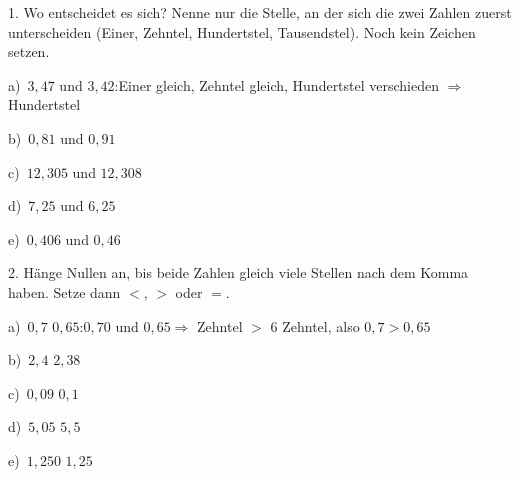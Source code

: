 \documentclass[11pt]{article}
\newcommand{\kennung}{FUR}
\newcommand{\grau}[1]{{\color{mbgrau}#1}}
\begin{document}
\pfheftstil
\fancyfoot[C]{\parbox[t]{\textwidth}{\mbfhbox\par\vspace{1.5mm}{\footnotesize\color{mbgrau}{\scriptsize \kennung}\hfill\thepage}}}
\begin{pfaufg}{}{1.}{}
Wo entscheidet es sich? Nenne nur die Stelle, an der sich die zwei Zahlen zuerst unterscheiden (Einer, Zehntel, Hundertstel, Tausendstel). Noch kein Zeichen setzen.\par\smallskip
\grau{a)\ $3{,}47$ und $3{,}42$:\quad Einer gleich, Zehntel gleich, Hundertstel verschieden $\Rightarrow$ Hundertstel}\par\medskip
\noindent\begin{minipage}[t]{0.48\linewidth}\raggedright
b)\ $0{,}81$ und $0{,}91$\linie{25mm}
\end{minipage}\hfill
\begin{minipage}[t]{0.48\linewidth}\raggedright
c)\ $12{,}305$ und $12{,}308$\linie{25mm}
\end{minipage}\par\smallskip
\noindent\begin{minipage}[t]{0.48\linewidth}\raggedright
d)\ $7{,}25$ und $6{,}25$\linie{25mm}
\end{minipage}\hfill
\begin{minipage}[t]{0.48\linewidth}\raggedright
e)\ $0{,}406$ und $0{,}46$\linie{25mm}
\end{minipage}\par\smallskip
{}
\end{pfaufg}

\begin{pfaufg}{}{2.}{}
Hänge Nullen an, bis beide Zahlen gleich viele Stellen nach dem Komma haben. Setze dann $<$, $>$ oder $=$.\par\smallskip
\grau{a)\ $0{,}7$ \fbox{\phantom{$<$}} $0{,}65$:\quad $0{,}70$ und $0{,}65$\quad$\Rightarrow$\quad 7 Zehntel $>$ 6 Zehntel, also $0{,}7 > 0{,}65$}\par\medskip
\noindent\begin{minipage}[t]{0.48\linewidth}\raggedright
b)\ $2{,}4$ \fbox{\phantom{$<$}} $2{,}38$\linie{25mm}
\end{minipage}\hfill
\begin{minipage}[t]{0.48\linewidth}\raggedright
c)\ $0{,}09$ \fbox{\phantom{$<$}} $0{,}1$\linie{25mm}
\end{minipage}\par\smallskip
\noindent\begin{minipage}[t]{0.48\linewidth}\raggedright
d)\ $5{,}05$ \fbox{\phantom{$<$}} $5{,}5$\linie{25mm}
\end{minipage}\hfill
\begin{minipage}[t]{0.48\linewidth}\raggedright
e)\ $1{,}250$ \fbox{\phantom{$<$}} $1{,}25$\linie{25mm}
\end{minipage}\par\smallskip
{}
\end{pfaufg}
\end{document}
